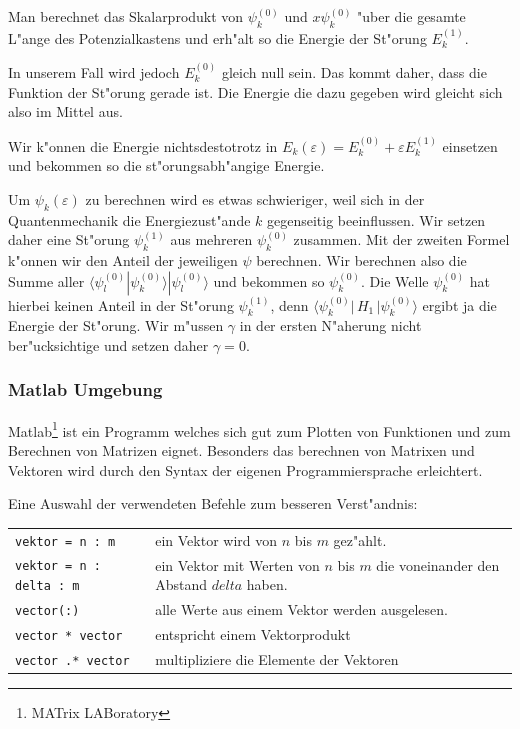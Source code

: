 \begin{refsection}
Man berechnet das Skalarprodukt von $\psi_k^{(0)}$ und $x \psi_k^{(0)}$ "uber 
die gesamte L"ange des Potenzialkastens und erh"alt so die Energie der St"orung $E_k^{(1)}$.

In unserem Fall wird jedoch $E_k^{(0)}$ gleich null sein.
Das kommt daher, dass die Funktion der St"orung gerade ist.
Die Energie die dazu gegeben wird gleicht sich also im Mittel aus.

Wir k"onnen die Energie nichtsdestotrotz in $E_k(\varepsilon)=E_k^{(0)} + \varepsilon E_k^{(1)}$ einsetzen
und bekommen so die st"orungsabh"angige Energie.

Um $\psi_k(\varepsilon)$ zu berechnen wird es etwas schwieriger, weil sich in der Quantenmechanik die Energiezust"ande $k$ gegenseitig beeinflussen.
Wir setzen daher eine St"orung $\psi_k^{(1)}$ aus mehreren $\psi_k^{(0)}$ zusammen.
Mit der zweiten Formel k"onnen wir den Anteil der jeweiligen $\psi$ berechnen.
Wir berechnen also die Summe aller $\langle\psi_l^{(0)}|\psi_k^{(0)}\rangle|\psi_l^{(0)}\rangle$
und bekommen so $\psi_k^{(0)}$.
Die Welle $\psi_k^{(0)}$ hat hierbei keinen Anteil in der St"orung $\psi_k^{(1)}$,
denn $\langle \psi_k^{(0)}|\, H_1 \,|\psi_k^{(0)}\rangle$ ergibt ja die Energie der St"orung.
Wir m"ussen $\gamma$ in der ersten N"aherung nicht ber"ucksichtige und setzen daher $\gamma = 0$.





\subsubsection{Matlab Umgebung}

Matlab\footnote{MATrix LABoratory} ist ein Programm welches sich gut zum Plotten von Funktionen
und zum Berechnen von Matrizen eignet.
Besonders das berechnen von Matrixen und Vektoren wird durch den Syntax der eigenen Programmiersprache erleichtert.

Eine Auswahl der verwendeten Befehle zum besseren Verst"andnis:
\begin{center}
\begin{tabular}{ll}
\verb|vektor = n : m| & ein Vektor wird von $n$ bis $m$ gez"ahlt.\\
\verb|vektor = n : delta : m| & ein Vektor mit Werten von $n$ bis $m$ die voneinander den Abstand $delta$ haben.\\
\verb|vector(:)| & alle Werte aus einem Vektor werden ausgelesen. \\
\verb|vector * vector| & entspricht einem Vektorprodukt \\
\verb|vector .* vector| & multipliziere die Elemente der Vektoren
\end{tabular}
\end{center}





\end{refsection}
